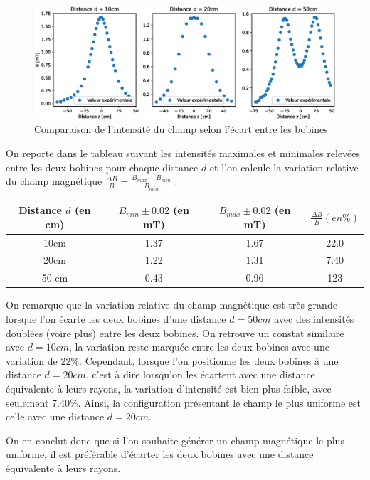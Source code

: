 \documentclass[12pt]{article}
\begin{document}
\begin{figure}[h!]
    \begin{center}
        \includegraphics[scale=0.6]{img/ChampDistance.eps}
    \end{center}
    \caption{Comparaison de l'intensité du champ selon l'écart entre les bobines}
\end{figure}

On reporte dans le tableau suivant les intensités maximales et minimales relevées entre les deux bobines pour chaque distance $d$ et l'on calcule la variation relative du champ magnétique
$\frac{\Delta B}{B} = \frac{B_{max} - B_{min}}{B_{min}}$ :

\begin{table}[h!]
    \begin{center}
        \begin{tabular}{c|c|c|c}
            Distance $d$ (en cm) & $B_{min} \pm 0.02$ (en mT) & $B_{max} \pm 0.02$ (en mT) & $\frac{\Delta B}{B} (en \%)$ \\ \hline
            10cm & 1.37 & 1.67 & 22.0 \\
            20cm & 1.22 & 1.31 & 7.40 \\
            50 cm & 0.43 & 0.96 & 123 \\
        \end{tabular}
    \end{center}
\end{table}

On remarque que la variation relative du champ magnétique est très grande lorsque l'on écarte les deux bobines d'une distance $d=50cm$ avec des intensités doublées (voire plus) entre les deux bobines. 
On retrouve un constat similaire avec $d=10cm$, la variation reste marquée entre les deux bobines avec une variation de $22\%$. Cependant, lorsque l'on positionne les deux bobines à une distance $d = 20cm$,
c'est à dire lorsqu'on les écartent avec une distance équivalente à leurs rayons, la variation d'intensité est bien plus faible, avec seulement 7.40\%. Ainsi, la configuration présentant 
le champ le plus uniforme est celle avec une distance $d=20cm$.

On en conclut donc que si l'on souhaite générer un champ magnétique le plus uniforme, il est préférable d'écarter les deux bobines avec une distance équivalente à leurs rayons.

\newpage
\end{document}
